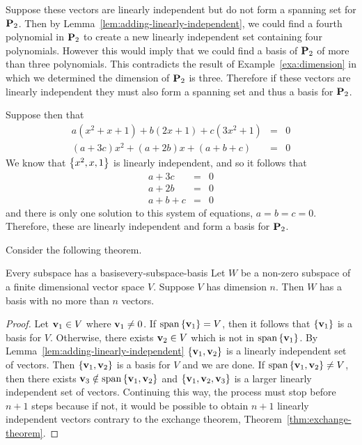 \begin{solution}
  Suppose these vectors are linearly independent but do not form a
  spanning set for $\mathbf{P}_2$. Then by
  Lemma~\ref{lem:adding-linearly-independent}, we could find a fourth
  polynomial in $\mathbf{P}_2$ to create a new linearly independent set
  containing four polynomials. However this would imply that we could
  find a basis of $\mathbf{P}_2$ of more than three polynomials. This
  contradicts the result of Example~\ref{exa:dimension} in which we
  determined the dimension of $\mathbf{P}_2$ is three.  Therefore if these
  vectors are linearly independent they must also form a spanning set
  and thus a basis for $\mathbf{P}_2$.

  Suppose then that
  \begin{eqnarray*}
    a(x^{2}+x+1) +b(2x+1) +c(3x^{2}+1) &=& 0\\
    (a+3c) x^{2}+(a+2b) x+(a+b+c) &=& 0
  \end{eqnarray*}
  We know that $\left\{x^2, x, 1 \right\}$ is linearly independent, and so it
  follows that
  \begin{eqnarray*}
    a+3c &=& 0 \\
    a+2b &=& 0 \\
    a+b+c &=& 0
  \end{eqnarray*}
  and there is only one solution to this system of equations,
  $a=b=c=0$.  Therefore, these are linearly independent and form a
  basis for $\mathbf{P}_2$.
\end{solution}

Consider the following theorem.

\begin{theorem}{Every subspace has a basis}{every-subspace-basis}
  Let $W$ be a non-zero subspace of a finite dimensional vector
  space $V$. Suppose $V$ has dimension $n$.
  Then $W$ has a basis
  with no more than $n$ vectors.
\end{theorem}

\begin{proof}
  Let $\mbox{\bf v}_{1}\in V$ where $\mbox{\bf v}_{1}\neq 0$. If
  $ \sspan\set{\vect{v}_{1}} =V$, then it follows that
  $\left\{\mbox{\bf v} _{1}\right\} $ is a basis for $V$. Otherwise, there exists
  $\mbox{\bf v} _{2}\in V$ which is not in $\sspan\set{\vect{v}_{1}}$. By
  Lemma~\ref{lem:adding-linearly-independent}
  $\left\{\mbox{\bf v}_{1},\mbox{\bf v}_{2}\right\} $ is a linearly independent set of
  vectors. Then $\left\{\mbox{\bf v}_{1},\mbox{\bf v} _{2}\right\} $ is a basis for $V$
  and we are done. If $\sspan\set{\vect{v}_{1}, \vect{v}_{2}} \neq V$,
  then there exists
  $\vect{v}_{3}\notin \sspan\set{\vect{v}_{1},\vect{v}_{2}} $ and
  $\left\{\mbox{\bf v} _{1},\mbox{\bf v}_{2},\mbox{\bf v}_{3}\right\} $ is a larger
  linearly independent set of vectors. Continuing this way, the
  process must stop before $n+1$ steps because if not, it would be
  possible to obtain $n+1$ linearly independent vectors contrary to
  the exchange theorem, Theorem~\ref{thm:exchange-theorem}.
\end{proof}

